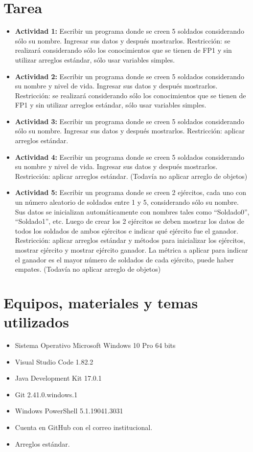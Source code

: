 \documentclass{article}
\begin{document}
\section{Tarea}
\begin{itemize}
	\item \textbf{Actividad 1:} Escribir un programa donde se creen 5 soldados considerando sólo su nombre. Ingresar sus datos y
	      después mostrarlos. Restricción: se realizará considerando sólo los conocimientos que se tienen de FP1 y sin utilizar arreglos estándar,
	      sólo usar variables simples.
	\item \textbf{Actividad 2:} Escribir un programa donde se creen 5 soldados considerando su nombre y nivel de vida. Ingresar sus
	      datos y después mostrarlos. Restricción: se realizará considerando sólo los conocimientos que se tienen de FP1 y sin utilizar arreglos estándar,
	      sólo usar variables simples.
	\item \textbf{Actividad 3:} Escribir un programa donde se creen 5 soldados considerando sólo su nombre. Ingresar sus datos y
	      después mostrarlos. Restricción: aplicar arreglos estándar.
	\item \textbf{Actividad 4:} Escribir un programa donde se creen 5 soldados considerando su nombre y nivel de vida. Ingresar sus
	      datos y después mostrarlos. Restricción: aplicar arreglos estándar. (Todavía no aplicar arreglo de objetos)
	\item \textbf{Actividad 5:} Escribir un programa donde se creen 2 ejércitos, cada uno con un número aleatorio de soldados entre
	      1 y 5, considerando sólo su nombre. Sus datos se inicializan automáticamente con nombres tales como “Soldado0”,
	      “Soldado1”, etc. Luego de crear los 2 ejércitos se deben mostrar los datos de todos los soldados de ambos ejércitos
	      e indicar qué ejército fue el ganador. Restricción: aplicar arreglos estándar y métodos para inicializar los ejércitos, mostrar ejército y mostrar ejército
	      ganador. La métrica a aplicar para indicar el ganador es el mayor número de soldados de cada ejército, puede
	      haber empates. (Todavía no aplicar arreglo de objetos)
\end{itemize}
\pagebreak

\section{Equipos, materiales y temas utilizados}
\begin{itemize}
	\item Sistema Operativo Microsoft Windows 10 Pro 64 bits
	\item Visual Studio Code 1.82.2
	\item Java Development Kit 17.0.1
	\item Git 2.41.0.windows.1
	\item Windows PowerShell 5.1.19041.3031
	\item Cuenta en GitHub con el correo institucional.
	\item Arreglos estándar.
\end{itemize}
\end{document}
